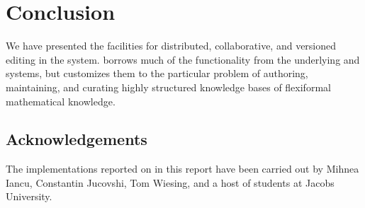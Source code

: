 \section{Conclusion}\label{sec:concl}

We have presented the facilities for distributed, collaborative, and versioned editing in
the \sys system. \sys borrows much of the functionality from the
underlying \git and \GitHub{}
systems, but customizes them to the particular problem of authoring, maintaining, and
curating highly structured knowledge bases of flexiformal mathematical knowledge. 

\subsection*{Acknowledgements}

The implementations reported on in this report have been carried out by Mihnea Iancu,
Constantin Jucovshi, Tom Wiesing, and a host of students at Jacobs University.



